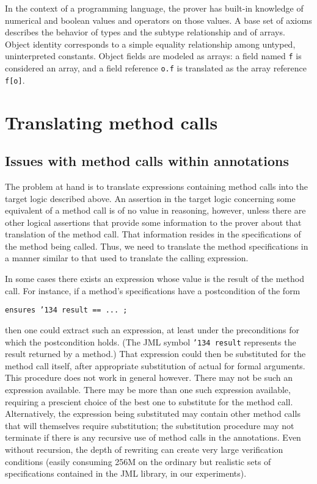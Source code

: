 \documentclass{sig-alternate}
\begin{document}
In the context of a programming language, the prover has built-in knowledge of numerical and
boolean values and operators on those values.  A base set of axioms describes the behavior 
of types and the subtype relationship and of arrays.  Object identity corresponds to a simple
equality relationship among untyped, uninterpreted constants.  Object fields are modeled as
arrays: a field named \texttt{f} is considered an array, and a field reference \texttt{o.f} is
translated as the array reference \texttt{f[o]}.

\section{Translating method calls}

\subsection{Issues with method calls within annotations}

The problem at hand is to translate expressions containing method calls into the target logic described above.  An assertion in the target logic concerning some equivalent of a method call is of no value in reasoning, however, unless there are other logical assertions that provide some 
information to the prover about that translation of the method call.  That information resides in
the specifications of the method being called.  Thus, we need to translate the method specifications
in a manner similar to that used to translate the calling expression.

In some cases there exists an expression whose value is the result of the method call.  For
instance, if a method's specifications have a postcondition of the form
\begin{center}\texttt{ensures \char'134 result == ... ; }\end{center}
then one could extract such an expression, at least under the preconditions for which the
postcondition holds.  (The JML symbol \texttt{\char'134 result} represents the result returned by a method.)  
That expression could then be substituted for the method call itself,
after appropriate substitution of actual for formal arguments.  This procedure does not work
in general however.  There may not be such an expression available.  There may be more than
one such
expression available, requiring a prescient choice of the best one to substitute for the method call.
Alternatively, the expression being substituted may contain other method calls that
will themselves require substitution; the substitution procedure may not terminate if there is
any recursive use of method calls in the annotations.  Even without recursion, the depth of
rewriting can create very large verification conditions (easily consuming 256M on the ordinary
but realistic sets of specifications contained in the JML library, in our experiments).
\end{document}
